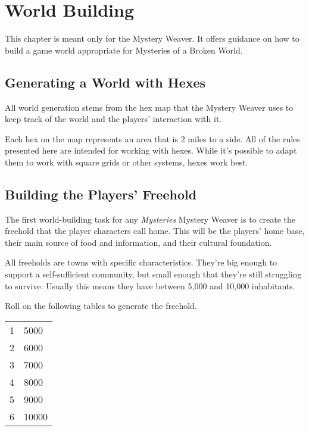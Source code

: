 \chapter{World Building}

\begin{multicols}{2}

This chapter is meant only for the Mystery Weaver. It offers
guidance on how to build a game world appropriate for Mysteries
of a Broken World.

\section{Generating a World with Hexes}

All world generation stems from the hex map that the Mystery Weaver
uses to keep track of the world and the players' interaction with
it.

Each hex on the map represents an area that is 2 miles to a side.
All of the rules presented here are intended for working with hexes.
While it's possible to adapt them to work with square grids or other
systems, hexes work best.

\section{Building the Players' Freehold}

The first world-building task for any \textit{Mysteries} Mystery Weaver is
to create the freehold that the player characters call home. This
will be the players' home base, their main source of food and
information, and their cultural foundation.

All freeholds are towns with specific characteristics. They're big
enough to support a self-sufficient community, but small enough
that they're still struggling to survive. Usually this means they
have between 5,000 and 10,000 inhabitants.

Roll on the following tables to generate the freehold.

\begin{center}
{
\begin{xtabular}{|l|l|}
1 & 5000 \\
2 & 6000 \\
3 & 7000 \\
4 & 8000 \\
5 & 9000 \\
6 & 10000 \\
\hline
\end{xtabular}
}
\end{center}

\end{multicols}
